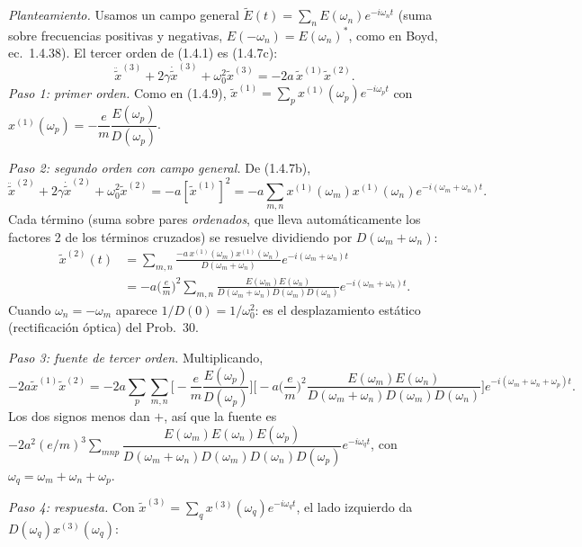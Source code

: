 \label{sol:31}

\emph{Planteamiento.} Usamos un campo general $\tilde E(t)=\sum_nE(\omega_n)e^{-i\omega_nt}$ (suma sobre frecuencias positivas y negativas, $E(-\omega_n)=E(\omega_n)^*$, como en Boyd, ec.~1.4.38). El tercer orden de (1.4.1) es (1.4.7c):
\[
\ddot{\tilde x}^{(3)}+2\gamma\dot{\tilde x}^{(3)}+\omega_0^2\tilde x^{(3)}=-2a\,\tilde x^{(1)}\tilde x^{(2)}.
\]
\emph{Paso 1: primer orden.} Como en (1.4.9), $\tilde x^{(1)}=\sum_px^{(1)}(\omega_p)e^{-i\omega_pt}$ con $x^{(1)}(\omega_p)=-\dfrac{e}{m}\dfrac{E(\omega_p)}{D(\omega_p)}$.

\emph{Paso 2: segundo orden con campo general.} De (1.4.7b),
\[\ddot{\tilde x}^{(2)}+2\gamma\dot{\tilde x}^{(2)}+\omega_0^2\tilde x^{(2)}=-a[\tilde x^{(1)}]^2=-a\sum_{m,n}x^{(1)}(\omega_m)x^{(1)}(\omega_n)e^{-i(\omega_m+\omega_n)t}.\]
Cada término (suma sobre pares \emph{ordenados}, que lleva automáticamente los factores 2 de los términos cruzados) se resuelve dividiendo por $D(\omega_m+\omega_n)$:
\begin{align*}
\tilde x^{(2)}(t)&=\sum_{m,n}\frac{-a\,x^{(1)}(\omega_m)x^{(1)}(\omega_n)}{D(\omega_m+\omega_n)}e^{-i(\omega_m+\omega_n)t}\\
&=-a\Big(\frac em\Big)^2\sum_{m,n}\frac{E(\omega_m)E(\omega_n)}{D(\omega_m+\omega_n)D(\omega_m)D(\omega_n)}e^{-i(\omega_m+\omega_n)t}.
\end{align*}
Cuando $\omega_n=-\omega_m$ aparece $1/D(0)=1/\omega_0^2$: es el desplazamiento estático (rectificación óptica) del Prob.~30.

\emph{Paso 3: fuente de tercer orden.} Multiplicando,
\[
-2a\tilde x^{(1)}\tilde x^{(2)}=-2a\sum_p\sum_{m,n}\Big[-\frac em\frac{E(\omega_p)}{D(\omega_p)}\Big]\Big[-a\Big(\frac em\Big)^2\frac{E(\omega_m)E(\omega_n)}{D(\omega_m+\omega_n)D(\omega_m)D(\omega_n)}\Big]e^{-i(\omega_m+\omega_n+\omega_p)t}.
\]
Los dos signos menos dan $+$, así que la fuente es $-2a^2(e/m)^3\sum_{mnp}\dfrac{E(\omega_m)E(\omega_n)E(\omega_p)}{D(\omega_m+\omega_n)D(\omega_m)D(\omega_n)D(\omega_p)}e^{-i\omega_qt}$, con $\omega_q=\omega_m+\omega_n+\omega_p$.

\emph{Paso 4: respuesta.} Con $\tilde x^{(3)}=\sum_qx^{(3)}(\omega_q)e^{-i\omega_qt}$, el lado izquierdo da $D(\omega_q)x^{(3)}(\omega_q)$:

